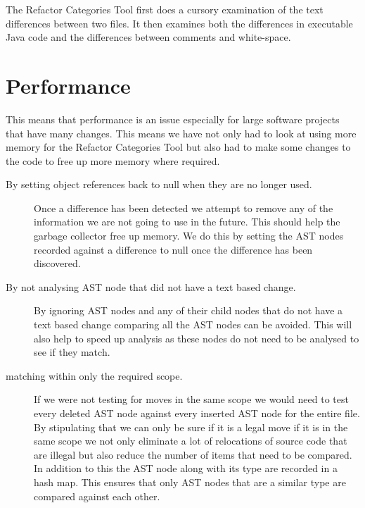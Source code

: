 The Refactor Categories Tool first does a cursory examination of the text differences between two files. It then examines both the differences in executable Java code and the differences between comments and white-space. 



\section{Performance}
 This means that performance is an issue especially for large software projects that have many changes. This means we have not only had to look at using more memory for the Refactor Categories Tool but also had to make some changes to the code to free up more memory where required.

\begin{description}
 \item [By setting object references back to null when they are no longer used.]
  Once a difference has been detected we attempt to remove any of the information we are not going to use in the future.  This should help the garbage collector free up memory. We do this by setting the AST nodes recorded against a difference to null once the difference has been discovered. 
\item [By not analysing AST node that did not have a text based change.] 
  By ignoring AST nodes and any of their child nodes that do not have a text based change comparing all the AST nodes can be avoided.  This will also help to speed up analysis as these nodes do not need to be analysed to see if they match.
\item [matching within only the required scope.]
  If we were not testing for moves in the same scope we would need to test every deleted AST node against every inserted AST node for the entire file. By stipulating that we can only be sure if it is a legal move if it is in the same scope we not only eliminate a lot of relocations of source code that are illegal but also reduce the number of items that need to be compared. In addition to this the AST node along with its type are recorded in a hash map.  This ensures that only AST nodes that are a similar type are compared against each other.
\end{description}


